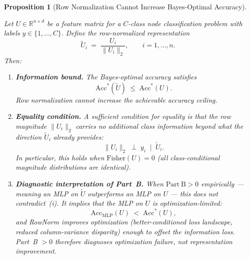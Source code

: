 \documentclass[11pt]{article}
\newtheorem{proposition}{Proposition}
\begin{document}
\begin{proposition}[Row Normalization Cannot Increase Bayes-Optimal Accuracy]
\label{prop:rownorm_bound}

Let $U \in \mathbb{R}^{n \times d}$ be a feature matrix for a $C$-class node
classification problem with labels $y \in \{1,\ldots,C\}$.
Define the row-normalized representation
\[
  \tilde{U}_i \;=\; \frac{U_i}{\|U_i\|_2}, \qquad i = 1,\ldots,n.
\]
Then:
\begin{enumerate}[label=(\roman*)]
  \item \textbf{Information bound.}
    The Bayes-optimal accuracy satisfies
    \[
      \mathrm{Acc}^*(\tilde{U}) \;\leq\; \mathrm{Acc}^*(U).
    \]
    Row normalization cannot increase the achievable accuracy ceiling.

  \item \textbf{Equality condition.}
    A sufficient condition for equality is that the row magnitude $\|U_i\|_2$
    carries no additional class information beyond what the direction $\tilde{U}_i$
    already provides:
    \[
      \|U_i\|_2 \;\perp\; y_i \;\mid\; \tilde{U}_i.
    \]
    In particular, this holds when $\mathrm{Fisher}(U) = 0$
    (all class-conditional magnitude distributions are identical).

  \item \textbf{Diagnostic interpretation of Part~B.}
    When $\mathrm{Part~B} > 0$ empirically --- meaning an MLP on $\tilde{U}$
    outperforms an MLP on $U$ --- this does not contradict~(i).
    It implies that the MLP on $U$ is \emph{optimization-limited}:
    \[
      \mathrm{Acc}_{\mathrm{MLP}}(U) \;<\; \mathrm{Acc}^*(U),
    \]
    and RowNorm improves optimization (better-conditioned loss landscape, reduced
    column-variance disparity) enough to offset the information loss.
    Part~B $> 0$ therefore diagnoses optimization failure, not representation
    improvement.
\end{enumerate}
\end{proposition}
\end{document}
